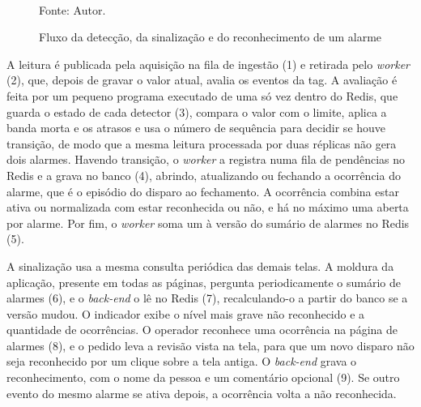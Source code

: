 \begin{figure}[H]
    \centering
    \caption{Fluxo da detecção, da sinalização e do reconhecimento de um alarme}
    \label{fig:fx_alarme}
    \vspace{0.4cm}
    \vspace{0.2cm} \\
    Fonte: Autor.
\end{figure}

\par A leitura é publicada pela aquisição na fila de ingestão (1) e retirada pelo \emph{worker} (2), que, depois de gravar o valor atual, avalia os eventos da tag. A avaliação é feita por um pequeno programa executado de uma só vez dentro do Redis, que guarda o estado de cada detector (3), compara o valor com o limite, aplica a banda morta e os atrasos e usa o número de sequência para decidir se houve transição, de modo que a mesma leitura processada por duas réplicas não gera dois alarmes. Havendo transição, o \emph{worker} a registra numa fila de pendências no Redis e a grava no banco (4), abrindo, atualizando ou fechando a ocorrência do alarme, que é o episódio do disparo ao fechamento. A ocorrência combina estar ativa ou normalizada com estar reconhecida ou não, e há no máximo uma aberta por alarme. Por fim, o \emph{worker} soma um à versão do sumário de alarmes no Redis (5).

\par A sinalização usa a mesma consulta periódica das demais telas. A moldura da aplicação, presente em todas as páginas, pergunta periodicamente o sumário de alarmes (6), e o \emph{back-end} o lê no Redis (7), recalculando-o a partir do banco se a versão mudou. O indicador exibe o nível mais grave não reconhecido e a quantidade de ocorrências. O operador reconhece uma ocorrência na página de alarmes (8), e o pedido leva a revisão vista na tela, para que um novo disparo não seja reconhecido por um clique sobre a tela antiga. O \emph{back-end} grava o reconhecimento, com o nome da pessoa e um comentário opcional (9). Se outro evento do mesmo alarme se ativa depois, a ocorrência volta a não reconhecida.

